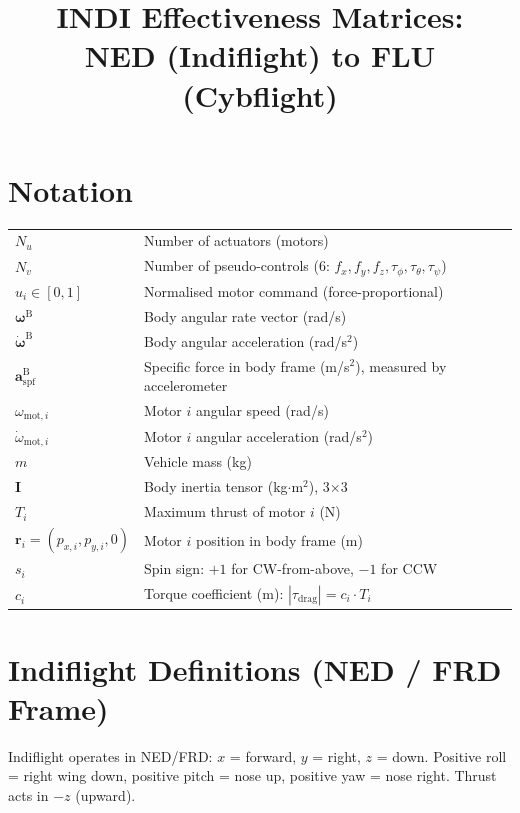 \documentclass[11pt]{article}
\title{INDI Effectiveness Matrices: \\ NED (Indiflight) to FLU (Cybflight)}
\author{}
\date{}
\newcommand{\body}{\mathrm{B}}
\newcommand{\spf}{\mathrm{spf}}
\begin{document}
\maketitle

\section{Notation}

\begin{tabular}{ll}
    $N_u$ & Number of actuators (motors) \\
    $N_v$ & Number of pseudo-controls (6: $f_x, f_y, f_z, \tau_\phi, \tau_\theta, \tau_\psi$) \\
    $u_i \in [0,1]$ & Normalised motor command (force-proportional) \\
    $\bm{\omega}^\body$ & Body angular rate vector (rad/s) \\
    $\dot{\bm{\omega}}^\body$ & Body angular acceleration (rad/s$^2$) \\
    $\bm{a}_\spf^\body$ & Specific force in body frame (m/s$^2$), measured by accelerometer \\
    $\omega_{\mathrm{mot},i}$ & Motor $i$ angular speed (rad/s) \\
    $\dot{\omega}_{\mathrm{mot},i}$ & Motor $i$ angular acceleration (rad/s$^2$) \\
    $m$ & Vehicle mass (kg) \\
    $\bm{I}$ & Body inertia tensor (kg$\cdot$m$^2$), 3$\times$3 \\
    $T_i$ & Maximum thrust of motor $i$ (N) \\
    $\bm{r}_i = (p_{x,i}, p_{y,i}, 0)$ & Motor $i$ position in body frame (m) \\
    $s_i$ & Spin sign: $+1$ for CW-from-above, $-1$ for CCW \\
    $c_i$ & Torque coefficient (m): $|\tau_\mathrm{drag}| = c_i \cdot T_i$ \\
\end{tabular}

\section{Indiflight Definitions (NED / FRD Frame)}

Indiflight operates in NED/FRD: $x$ = forward, $y$ = right, $z$ = down.
Positive roll = right wing down, positive pitch = nose up, positive yaw = nose right.
Thrust acts in $-z$ (upward).
\end{document}
